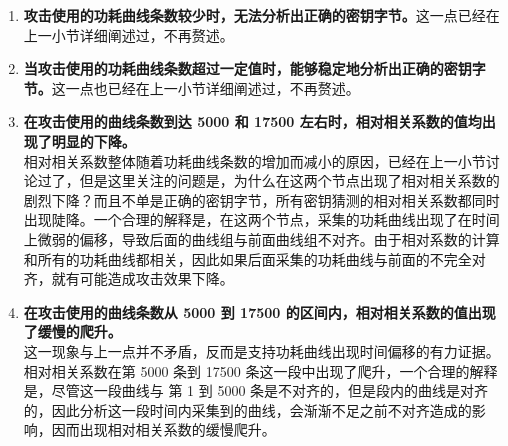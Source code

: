 \begin{enumerate}
    \item \textbf{攻击使用的功耗曲线条数较少时，无法分析出正确的密钥字节。}这一点已经在上一小节详细阐述过，不再赘述。
    \item \textbf{当攻击使用的功耗曲线条数超过一定值时，能够稳定地分析出正确的密钥字节。}这一点也已经在上一小节详细阐述过，不再赘述。
    \item \textbf{在攻击使用的曲线条数到达 5000 和 17500 左右时，相对相关系数的值均出现了明显的下降。}\\
    相对相关系数整体随着功耗曲线条数的增加而减小的原因，已经在上一小节讨论过了，但是这里关注的问题是，为什么在这两个节点出现了相对相关系数的剧烈下降？而且不单是正确的密钥字节，所有密钥猜测的相对相关系数都同时出现陡降。一个合理的解释是，在这两个节点，采集的功耗曲线出现了在时间上微弱的偏移，导致后面的曲线组与前面曲线组不对齐。由于相对系数的计算和所有的功耗曲线都相关，因此如果后面采集的功耗曲线与前面的不完全对齐，就有可能造成攻击效果下降。
    \item \textbf{在攻击使用的曲线条数从 5000 到 17500 的区间内，相对相关系数的值出现了缓慢的爬升。}\\
    这一现象与上一点并不矛盾，反而是支持功耗曲线出现时间偏移的有力证据。相对相关系数在第 5000 条到 17500 条这一段中出现了爬升，一个合理的解释是，尽管这一段曲线与 第 1 到 5000 条是不对齐的，但是段内的曲线是对齐的，因此分析这一段时间内采集到的曲线，会渐渐不足之前不对齐造成的影响，因而出现相对相关系数的缓慢爬升。

\end{enumerate}


